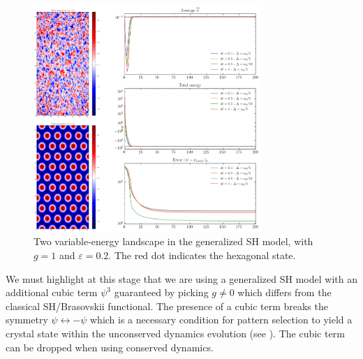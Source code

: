 \documentclass{article}
\begin{document}
\begin{figure}[H]
   \centering
   \includegraphics[width=0.77\textwidth]{imgs/weakcoupling/dipole/validationNoise.png}
   \caption{Two variable-energy landscape in the generalized SH model, with $g=1$ and $\varepsilon=0.2$. The red dot indicates the hexagonal state.}\label{fig:SH_Gen_Noise}
\end{figure}
We must highlight at this stage that we are using a generalized SH model with an additional cubic term $\psi^3$ guaranteed by picking $g \neq 0$ which differs from the classical SH/Brasovskii functional. The presence of a cubic term breaks the symmetry $\psi \longleftrightarrow -\psi$ which is a necessary condition for pattern selection to yield a crystal state within the unconserved dynamics evolution (see \cite{crossPatternFormation2009}). The cubic term can be dropped when using conserved dynamics.
\end{document}
